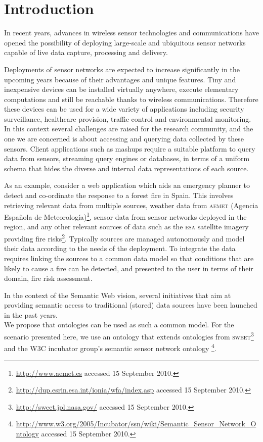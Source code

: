 \section{Introduction}
\label{intro}
In recent years, advances in wireless sensor technologies and communications have opened the possibility of deploying large-scale and ubiquitous sensor networks capable of live data capture, processing and delivery.
 
Deployments of sensor networks are expected to increase significantly in the upcoming years because of their advantages and unique features. Tiny and inexpensive devices can be installed virtually anywhere, execute elementary computations and still be reachable thanks to wireless communications. Therefore these devices can be used for a wide variety of applications including security surveillance, healthcare provision, traffic control and environmental monitoring.
In this context several challenges are raised for the research community, and the one we are concerned is about accessing and querying data collected by these sensors. Client applications such as mashups require a suitable platform to query data from sensors, streaming query engines or databases, in terms of a uniform schema that hides the diverse and internal data representations of each source.

As an example, consider a web application which aids an emergency planner to detect and co-ordinate the response to a forest fire in Spain. 
This involves retrieving relevant data from multiple sources, \eg weather data from \textsc{aemet} (Agencia Espa\~nola de Meteorolog\'ia)\footnote{\url{http://www.aemet.es} accessed 15 September 2010.}, sensor data from sensor networks deployed in the region, and any other relevant sources of data such as the \textsc{esa} satellite imagery providing fire risks\footnote{\url{http://dup.esrin.esa.int/ionia/wfa/index.asp} accessed 15 September 2010.}. 
Typically sources are managed autonomously and model their data according to the needs of the deployment. 
To integrate the data requires linking the sources to a common data model so that conditions that are likely to cause a fire can be detected, and presented to the user in terms of their domain, \eg fire risk assessment. 

In the context of the Semantic Web vision, several initiatives that aim at providing semantic access to traditional (stored) data sources have been launched in the past years.
\\
We propose that ontologies can be used as such a common model. 
For the scenario presented here, we use an ontology that extends ontologies from \textsc{sweet}\footnote{\url{http://sweet.jpl.nasa.gov/} accessed 15 September 2010.} and the W3C incubator group's semantic sensor network ontology
\footnote{\url{http://www.w3.org/2005/Incubator/ssn/wiki/Semantic_Sensor_Network_Ontology} accessed 15 September 2010.}.

